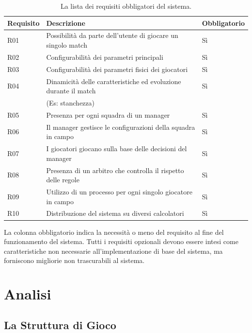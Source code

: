 \documentclass[aps,letterpaper,10pt]{article}
\begin{document}
\begin{table}[H]
\begin{center}
	\begin{tabular}{|l|l|l|}
		\hline
		\textbf{Requisito} & \textbf{Descrizione} & \textbf{Obbligatorio} \\ \hline \hline
		R01 & Possibilit\`a da parte dell'utente di giocare un singolo match & S\`i \\ \hline
		R02 & Configurabilit\`a dei parametri principali & S\`i \\ \hline
		R03 & Configurabilit\`a dei parametri fisici dei giocatori & S\`i \\ \hline
		R04 & Dinamicit\`a delle caratteristiche ed evoluzione durante il match & S\`i \\ 
		& (Es: stanchezza) & \\ \hline
		R05 & Presenza per ogni squadra di un manager & S\`i \\ \hline
		R06 & Il manager gestisce le configurazioni della squadra in campo  & S\`i \\ \hline
		R07 & I giocatori giocano sulla base delle decisioni del manager & S\`i \\ \hline
		R08 & Presenza di un arbitro che controlla il rispetto delle regole & S\`i \\ \hline
		R09 & Utilizzo di un processo per ogni singolo giocatore in campo & S\`i \\ \hline
 		R10 & Distribuzione del sistema su diversi calcolatori & S\`i \\ \hline
		\end{tabular}
\end{center}
\caption{La lista dei requisiti obbligatori del sistema.}
\end{table}

La colonna obbligatorio indica la necessit\`a o meno del requisito al fine del funzionamento del sistema. Tutti i
requisiti opzionali devono essere intesi come caratteristiche non necessarie all'implementazione di base del sistema, ma
forniscono migliorie non trascurabili al sistema.

\newpage

\section{Analisi}

\subsection{La Struttura di Gioco}
\end{document}
